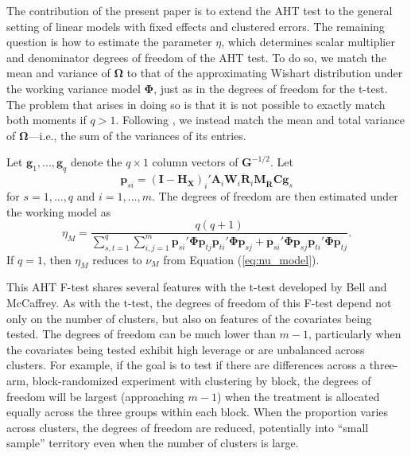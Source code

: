 \documentclass[12pt]{article}\usepackage[]{graphicx}\usepackage[]{color}
\newcommand{\bm}{\mathbf}
\newcommand{\bs}{\boldsymbol}
\begin{document}
The contribution of the present paper is to extend the AHT test to the general setting of linear models with fixed effects and clustered errors. 
The remaining question is how to estimate the parameter $\eta$, which determines scalar multiplier and denominator degrees of freedom of the AHT test. 
To do so, we match the mean and variance of $\bs\Omega$ to that of the approximating Wishart distribution under the working variance model $\bs\Phi$, just as in the degrees of freedom for the t-test. 
The problem that arises in doing so is that it is not possible to exactly match both moments if $q > 1$.
Following \citet{Tipton2015small-F}, we instead match the mean and total variance of $\bs\Omega$---i.e., the sum of the variances of its entries.

Let $\bm{g}_1,...,\bm{g}_q$ denote the $q \times 1$ column vectors of $\bm{G}^{-1/2}$. 
Let \[
\bm{p}_{si} = \left(\bm{I} - \bm{H_X}\right)_i' \bm{A}_i \bm{W}_i \bm{\ddot{R}}_i \bm{M_{\ddot{R}}}\bm{C} \bm{g}_s \]
for $s = 1,...,q$ and $i = 1,...,m$. 
The degrees of freedom are then estimated under the working model as
\begin{equation}
\label{eq:eta_model}
\eta_M = \frac{q(q + 1)}{\sum_{s,t=1}^q \sum_{i,j=1}^m \bm{p}_{si}'\bs\Phi\bm{p}_{tj} \bm{p}_{ti}'\bs\Phi\bm{p}_{sj} + \bm{p}_{si}'\bs\Phi\bm{p}_{sj} \bm{p}_{ti}'\bs\Phi\bm{p}_{tj}}.
\end{equation}
If $q = 1$, then $\eta_M$ reduces to $\nu_M$ from Equation (\ref{eq:nu_model}).

This AHT F-test shares several features with the t-test developed by Bell and McCaffrey. As with the t-test, the degrees of freedom of this F-test depend not only on the number of clusters, but also on features of the covariates being tested. 
The degrees of freedom can be much lower than $m - 1$, particularly when the covariates being tested exhibit high leverage or are unbalanced across clusters. 
For example, if the goal is to test if there are differences across a three-arm, block-randomized experiment with clustering by block, the degrees of freedom will be largest (approaching $m - 1$) when the treatment is allocated equally across the three groups within each block. 
When the proportion varies across clusters, the degrees of freedom are reduced, potentially into ``small sample'' territory even when the number of clusters is large. 
\end{document}
